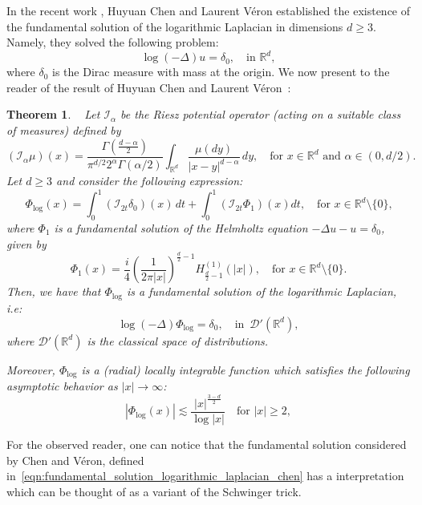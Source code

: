 \documentclass[11pt]{amsart}
\newcommand{\R}{\mathbb{R}}
\newtheorem{theorem}{Theorem}
\begin{document}
In the recent work \cite{MR4741033}, Huyuan Chen and Laurent V\'eron established the existence of the fundamental solution of the logarithmic Laplacian in dimensions $d\geq 3$. Namely, they solved the following problem:
\begin{equation*}
	\log(-\Delta)u=\delta_0, \quad \text{in $\R^d$}, 
\end{equation*}
where $ \delta_0 $ is the Dirac measure with mass at the origin.
We now present to the reader of the result of Huyuan Chen and Laurent V\'eron\ \cite{MR4741033}:
\begin{theorem}\label{thm:chen_veron}
	~\cite[Theorem 1.8]{MR4741033}
	Let $\mathcal{I}_{\alpha}$ be the Riesz potential operator (acting on a suitable class of measures) defined by
	\begin{equation*}
(\mathcal{I}_{\alpha}\mu)(x) = \frac{\Gamma\left (\frac{d-\alpha}{2}\right )}{\pi^{d/2}2^{\alpha}\Gamma(\alpha/2)}\int_{\mathbb{R}^d} \frac{\mu(dy)}{|x-y|^{d-\alpha}} \, dy, \quad \text{for $x\in \mathbb{R}^d$ and $\alpha \in (0,d/2)$.}
	\end{equation*}
	Let $d \geq 3$ and consider the following expression: 
\begin{equation}
\label{eqn:fundamental_solution_logarithmic_laplacian_chen}
\Phi_{\log}(x) = \int_0^1 (\mathcal{I}_{2t}\delta_0)(x) \, dt +\int_0^1 (\mathcal{I}_{2t}\Phi_1) (x) dt, \quad \text{for $x\in \mathbb{R}^d \setminus \{0\}$,}
\end{equation}
where $\Phi_1$ is a fundamental solution of the Helmholtz equation $ -\Delta u - u = \delta_0 $, given by
\begin{equation*}
\Phi_1(x) = \frac{i}{4} \left( \frac{1}{2\pi |x|} \right)^{\frac{d}{2} - 1} H^{(1)}_{\frac{d}{2} - 1}(|x|),\quad \text{for } x \in \mathbb{R}^d \setminus \{0\}.
\end{equation*}
Then, we have that  $\Phi_{\log}$ is a fundamental solution of the logarithmic Laplacian, i.e:
\begin{equation}\label{eqn:fundamental_solution_logarithmic_laplacian_old}
\log(-\Delta)\Phi_{\log}=\delta_0, \quad \text{in }\,\mathcal{D}'(\mathbb{R}^d),
\end{equation}
where $\mathcal{D}'(\R^d)$ is the classical space of distributions.

 Moreover, $ \Phi_{\log} $ is a (radial) locally integrable function which satisfies the following asymptotic behavior as $ |x| \to \infty $:
\begin{equation*}
|\Phi_{\log}(x)| \lesssim \frac{|x|^{\frac{3 - d}{2}}}{\log |x|} \quad \text{for } |x| \geq 2,
\end{equation*}
\end{theorem}
For the observed reader, one can notice that the fundamental solution considered by Chen and V\'eron, defined in~\eqref{eqn:fundamental_solution_logarithmic_laplacian_chen} has a interpretation which can be thought of as a variant of the Schwinger trick.
\end{document}
